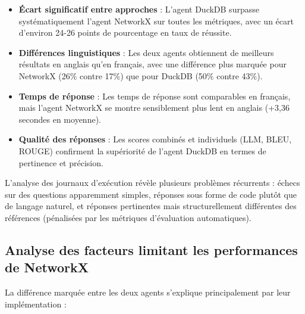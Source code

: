 \documentclass[a4paper,11pt]{article}
\begin{document}
\begin{itemize}
    \item \textbf{Écart significatif entre approches} : L'agent DuckDB surpasse systématiquement l'agent NetworkX sur toutes les métriques, avec un écart d'environ 24-26 points de pourcentage en taux de réussite.
    
    \item \textbf{Différences linguistiques} : Les deux agents obtiennent de meilleurs résultats en anglais qu'en français, avec une différence plus marquée pour NetworkX (26\% contre 17\%) que pour DuckDB (50\% contre 43\%).
    
    \item \textbf{Temps de réponse} : Les temps de réponse sont comparables en français, mais l'agent NetworkX se montre sensiblement plus lent en anglais (+3,36 secondes en moyenne).
    
    \item \textbf{Qualité des réponses} : Les scores combinés et individuels (LLM, BLEU, ROUGE) confirment la supériorité de l'agent DuckDB en termes de pertinence et précision.
\end{itemize}

L'analyse des journaux d'exécution révèle plusieurs problèmes récurrents : échecs sur des questions apparemment simples, réponses sous forme de code plutôt que de langage naturel, et réponses pertinentes mais structurellement différentes des références (pénalisées par les métriques d'évaluation automatiques).

\subsection{Analyse des facteurs limitant les performances de NetworkX}

La différence marquée entre les deux agents s'explique principalement par leur implémentation :
\end{document}
